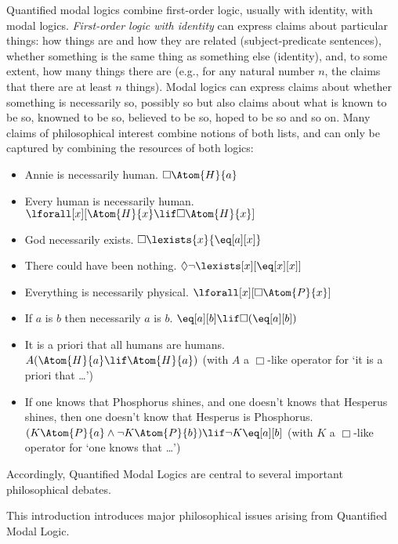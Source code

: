 \documentclass[../../../include/open-logic-section]{subfiles}
\begin{document}


Quantified modal logics combine first-order logic, usually with
 identity, with modal logics. \emph{First-order logic with identity}
 can express claims about particular things: how things are and how
 they are related (subject-predicate sentences), whether something is
 the same thing as something else (identity), and, to some extent, how
 many things there are (e.g., for any natural number $n$, the claims
 that there are at least $n$ things). Modal logics can express claims
 about whether something is necessarily so, possibly so but also
 claims about what is known to be so, knowned to be so, believed to be
 so, hoped to be so and so on. Many claims of philosophical interest
 combine notions of both lists, and can only be captured by combining
 the resources of both logics:

\begin{itemize}
\item Annie is necessarily human. $\Box\Atom{H}{a}$
\item Every human is necessarily human. $\lforall[x][\Atom{H}{x}\lif\Box\Atom{H}{x}]$
\item God necessarily exists. $\Box\lexists{x}{\eq[a][x]}$
\item There could have been nothing. $\Diamond\lnot\lexists[x][\eq[x][x]]$
\item Everything is necessarily physical. $\lforall[x][\Box\Atom{P}{x}]$
\item If $a$ is $b$ then necessarily $a$ is $b$. $\eq[a][b]\lif\Box(\eq[a][b])$
\item It is a priori that all humans are humans.
$A(\Atom{H}{a}\lif\Atom{H}{a})$ (with $A$ a $\Box$-like operator 
for `it is a priori that \dots')
\item If one knows that Phosphorus shines, and one doesn't knows that
Hesperus shines, then one doesn't know that Hesperus is Phosphorus.
$(K\Atom{P}{a}\land\lnot K\Atom{P}{b})\lif\lnot K\eq[a][b]$ (with $K$ 
a $\Box$-like operator for `one knows that \dots')
\end{itemize}

Accordingly, Quantified Modal Logics are central to several important
philosophical debates. 

This introduction introduces major philosophical issues arising from
Quantified Modal Logic.
\end{document}
